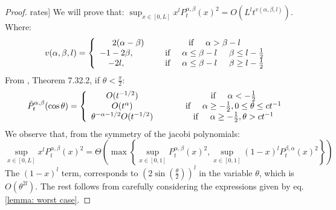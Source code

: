 \documentclass{article}
\begin{document}
\worstcase *
\begin{proof}
rates]
We will prove that:  $\sup_{x\in[0,L]}x^lP_t^{\alpha,\beta}(x)^2=O(L^lt^{v(\alpha,\beta,l)})$. Where:
\begin{equation}
    v(\alpha,\beta,l)=\left\{
    \begin{array}{cc}
           2(\alpha-\beta) &\text{if} \hspace{0.5 cm} \alpha>\beta-l \\
         -1-2\beta, \hspace{1 cm} &\text{if} \hspace{0.5 cm} \alpha\leq \beta-l\hspace{0.5 cm} \beta\leq l-\frac{1}{2}\\
         -2l, \hspace{1 cm} &\text{if} \hspace{0.5 cm} \alpha\leq\beta-l\hspace{0.5 cm} \beta\geq l-\frac{1}{2} 
    \end{array}
    \right . 
\end{equation}
From \cite{szego1975orthogonal}, Theorem 7.32.2, if $\theta<\frac{\pi}{2}$:
\begin{equation}
    \Tilde{P}_t^{\alpha,\beta}(\cos \theta)=\left\{ 
    \begin{array}{cc}
         O(t^{-1/2})  \hspace{1 cm} &\text{if} \hspace{0.5 cm} \alpha < -\frac{1}{2} \\
         O(t^{\alpha})  \hspace{1 cm} &\text{if} \hspace{0.5 cm} \alpha \geq -\frac{1}{2} , 0\leq\theta\leq ct^{-1} \\
         \theta^{-
         \alpha-1/2}O(t^{-1/2})  \hspace{1 cm} &\text{if} \hspace{0.5 cm} \alpha \geq -\frac{1}{2} , \theta> ct^{-1}
    \end{array}
    \right .
\label{lemma: worst case}
\end{equation}
We observe that, from the symmetry of the jacobi polynomials:
\begin{equation}
    \sup_{x\in[0,L]}x^lP_t^{\alpha,\beta}(x)^2 =\Theta\left( \max\left\{\sup_{x\in[0,1]}P_t^{\alpha,\beta}(x)^2,\sup_{x\in[0,1]}(1-x)^lP_t^{\beta,\alpha}(x)^2\right\}\right)
\end{equation}
The $(1-x)^l$ term,  corresponds to $(2\sin(\frac{\theta}{2}))^l$ in the variable $\theta$, which is $O(\theta^{2l})$. The rest follows from carefully considering the expressions given by eq. \ref{lemma: worst case}.
\end{proof}
\end{document}

